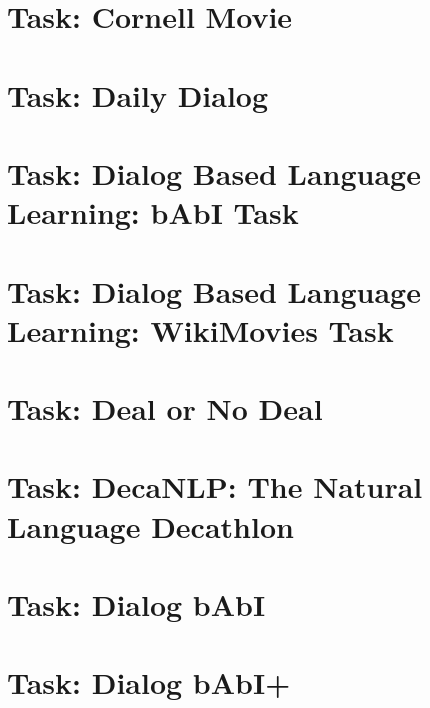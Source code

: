 \documentclass[twoside]{book}
\newcommand{\+}{\discretionary{\mbox{\scriptsize$\hookleftarrow$}}{}{}}
\begin{document}
\chapter{Task\+: Cornell Movie}
\label{md_parlai_tasks_cornell_movie_README}

\chapter{Task\+: Daily Dialog}
\label{md_parlai_tasks_dailydialog_README}

\chapter{Task\+: Dialog Based Language Learning\+: b\+AbI Task}
\label{md_parlai_tasks_dbll_babi_README}

\chapter{Task\+: Dialog Based Language Learning\+: Wiki\+Movies Task}
\label{md_parlai_tasks_dbll_movie_README}

\chapter{Task\+: Deal or No Deal}
\label{md_parlai_tasks_dealnodeal_README}

\chapter{Task\+: Deca\+N\+LP\+: The Natural Language Decathlon}
\label{md_parlai_tasks_decanlp_README}

\chapter{Task\+: Dialog b\+AbI}
\label{md_parlai_tasks_dialog_babi_README}

\chapter{Task\+: Dialog b\+Ab\+I+}
\label{md_parlai_tasks_dialog_babi_plus_README}

\end{document}
